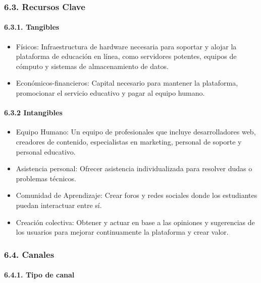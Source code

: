 \documentclass[
]{article}
\providecommand{\tightlist}{%
  \setlength{\itemsep}{0pt}\setlength{\parskip}{0pt}}
\begin{document}
\subsubsection{6.3. Recursos Clave}\label{recursos-clave}

\paragraph{6.3.1. Tangibles}\label{tangibles}

\begin{itemize}
\tightlist
\item
  Físicos: Infraestructura de hardware necesaria para soportar y alojar
  la plataforma de educación en línea, como servidores potentes, equipos
  de cómputo y sistemas de almacenamiento de datos.
\item
  Económicos-financieros: Capital necesario para mantener la plataforma,
  promocionar el servicio educativo y pagar al equipo humano.
\end{itemize}

\paragraph{6.3.2 Intangibles}\label{intangibles}

\begin{itemize}
\tightlist
\item
  Equipo Humano: Un equipo de profesionales que incluye desarrolladores
  web, creadores de contenido, especialistas en marketing, personal de
  soporte y personal educativo.
\item
  Asistencia personal: Ofrecer asistencia individualizada para resolver
  dudas o problemas técnicos.
\item
  Comunidad de Aprendizaje: Crear foros y redes sociales donde los
  estudiantes puedan interactuar entre sí.
\item
  Creación colectiva: Obtener y actuar en base a las opiniones y
  sugerencias de los usuarios para mejorar continuamente la plataforma y
  crear valor.
\end{itemize}

\subsubsection{6.4. Canales}\label{canales}

\paragraph{6.4.1. Tipo de canal}\label{tipo-de-canal}
\end{document}
